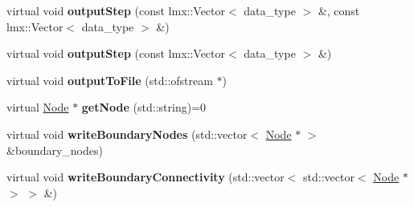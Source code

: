 \begin{CompactItemize}
\item 
\hypertarget{classmknix_1_1RigidBody_721e9f81cfba9a3d425df36f7cf5ef71}{
virtual void \textbf{outputStep} (const lmx::Vector$<$ data\_\-type $>$ \&, const lmx::Vector$<$ data\_\-type $>$ \&)}
\label{classmknix_1_1RigidBody_721e9f81cfba9a3d425df36f7cf5ef71}

\item 
\hypertarget{classmknix_1_1RigidBody_605ed074fed7570c6620a6a6f6cd4bb0}{
virtual void \textbf{outputStep} (const lmx::Vector$<$ data\_\-type $>$ \&)}
\label{classmknix_1_1RigidBody_605ed074fed7570c6620a6a6f6cd4bb0}

\item 
\hypertarget{classmknix_1_1RigidBody_0b0df6ee53217187a301f224b8fe0d92}{
virtual void \textbf{outputToFile} (std::ofstream $\ast$)}
\label{classmknix_1_1RigidBody_0b0df6ee53217187a301f224b8fe0d92}

\item 
\hypertarget{classmknix_1_1RigidBody_b3b3597652fb9b5d375fec83e23a7f36}{
virtual \hyperlink{classmknix_1_1Node}{Node} $\ast$ \textbf{getNode} (std::string)=0}
\label{classmknix_1_1RigidBody_b3b3597652fb9b5d375fec83e23a7f36}

\item 
\hypertarget{classmknix_1_1RigidBody_1764d3673d14d5a681cd2561d721fba1}{
virtual void \textbf{writeBoundaryNodes} (std::vector$<$ \hyperlink{classmknix_1_1Node}{Node} $\ast$ $>$ \&boundary\_\-nodes)}
\label{classmknix_1_1RigidBody_1764d3673d14d5a681cd2561d721fba1}

\item 
\hypertarget{classmknix_1_1RigidBody_60ad96e6110f259021c31568d3a3bcfb}{
virtual void \textbf{writeBoundaryConnectivity} (std::vector$<$ std::vector$<$ \hyperlink{classmknix_1_1Node}{Node} $\ast$ $>$ $>$ \&)}
\label{classmknix_1_1RigidBody_60ad96e6110f259021c31568d3a3bcfb}

\end{CompactItemize}
